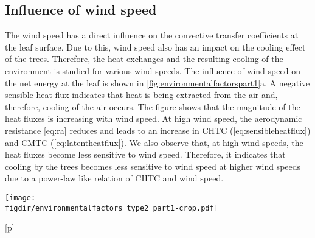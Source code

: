 \subsection{Influence of wind speed}

The wind speed has a direct influence on the convective transfer coefficients at the leaf surface. Due to this, wind speed also has an impact on the cooling effect of the trees. Therefore, the heat exchanges and the resulting cooling of the environment is studied for various wind speeds. The influence of wind speed on the net energy at the leaf is shown in \cref{fig:environmentalfactorspart1}a. A negative sensible heat flux indicates that heat is being extracted from the air and, therefore, cooling of the air occurs. The figure shows that the magnitude of the heat fluxes is increasing with wind speed. At high wind speed, the aerodynamic resistance \cref{eq:ra} reduces and leads to an increase in CHTC (\cref{eq:sensibleheatflux}) and CMTC (\cref{eq:latentheatflux}). We also observe that, at high wind speeds, the heat fluxes become less sensitive to wind speed. Therefore, it indicates that cooling by the trees becomes less sensitive to wind speed at higher wind speeds due to a power-law like relation of CHTC and wind speed. 

	\begin{sidewaysfigure}[p]
	\centering
	\texttt{[image: \\figdir/environmentalfactors\_type2\_part1-crop.pdf]}
	\caption{Influence of wind speed (m\,s$^{-1}$) on   on the net energy balance of radiation, sensible and latent heat fluxes at the trees, $\int a \cdot (q_{\textit{rad,leaf}}-q_{\textit{sen,leaf}}-q_{\textit{lat,leaf}})\ dA = 0$ (W\,m$^{-1}$),  on air temperature $T-T_0$ ($^{\circ}$C), and  on $\textit{UTCI}$ ($^{\circ}$C). Point measurement of air temperature and $UTCI$ at three locations as shown in \cref{fig:domain}: \textit{upstream} ({\color{flatuidarkred}\textbf{red}}), \textit{downstream} ({\color{flatuidarkblue}\textbf{blue}}) and \textit{shaded} (\textbf{black}) for transpiring (T) (solid, ---) and non-transpiring (NT) conditions (dashed, - - -).}
	\label{fig:environmentalfactorspart1}
	\end{sidewaysfigure}[p]
	
